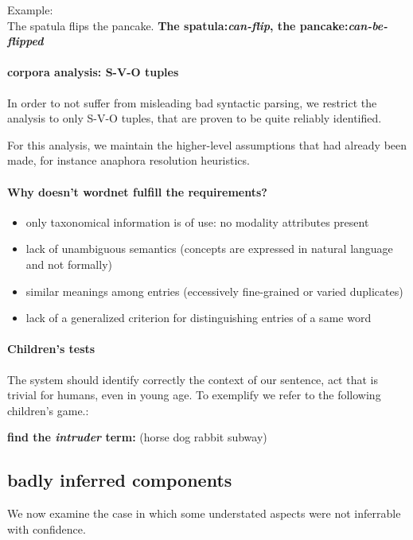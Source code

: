\documentclass[10pt,a4paper]{article}
\begin{document}
Example:\\

{\color{Bittersweet} The spatula flips the pancake.
\textbf{The spatula:\textit{can-flip}, the pancake:\textit{can-be-flipped}}
}\\


\paragraph{corpora analysis: S-V-O tuples}

In order to not suffer from misleading bad syntactic parsing,
we restrict the analysis to only S-V-O tuples, that are
proven to be quite reliably identified.

For this analysis, we maintain the higher-level assumptions that
had already been made, for instance anaphora resolution heuristics.


\paragraph{Why doesn't wordnet fulfill the requirements?} 
\begin{itemize}
 \item only taxonomical information is of use: no modality attributes present
 \item lack of unambiguous semantics (concepts are expressed in natural language and not formally)
 \item similar meanings among entries (eccessively fine-grained or varied duplicates)
 \item lack of a generalized criterion for distinguishing entries of a same word
\end{itemize}

\paragraph{Children's tests}
The system should identify correctly the context of our sentence, 
act that is trivial for humans, even in young age. To exemplify we
refer to the following children's game.:

{\color{Bittersweet} \textbf{find the \textit{intruder} term:} (horse dog rabbit subway)}

\subsection{badly inferred components}
We now examine the case in which some understated aspects were not inferrable with confidence.
\end{document}
